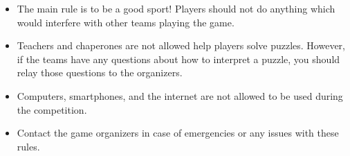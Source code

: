 \begin{rules}
\vfill

\newpage


\begin{itemize}
\item The main rule is to be a good sport! Players should not do anything which
would interfere with other teams playing the game.
\item Teachers and chaperones are not allowed help players solve puzzles. However,
if the teams have any questions about how to interpret a puzzle, you should relay
those questions to the organizers.
\item Computers, smartphones, and the internet are not allowed to be used during
the competition.
\item Contact the game organizers in case of emergencies
or any issues with these rules.
\end{itemize}

\end{rules}
